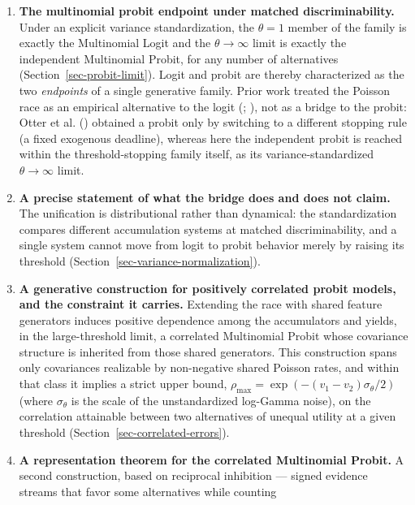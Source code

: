 \documentclass[
  man,
  floatsintext,
  longtable,
  a4paper,
  nolmodern,
  notxfonts,
  notimes,
  colorlinks=true,linkcolor=blue,citecolor=blue,urlcolor=blue]{apa7}
\begin{document}
\begin{enumerate}
\def\labelenumi{\arabic{enumi}.}
\item
  \textbf{The multinomial probit endpoint under matched
  discriminability.} Under an explicit variance standardization, the
  \(\theta = 1\) member of the family is exactly the Multinomial Logit
  and the \(\theta \to \infty\) limit is exactly the independent
  Multinomial Probit, for any number of alternatives
  (Section~\ref{sec-probit-limit}). Logit and probit are thereby
  characterized as the two \emph{endpoints} of a single generative
  family. Prior work treated the Poisson race as an empirical
  alternative to the logit
  (;
  ), not
  as a bridge to the probit: Otter et al.
  () obtained a
  probit only by switching to a different stopping rule (a fixed
  exogenous deadline), whereas here the independent probit is reached
  within the threshold-stopping family itself, as its
  variance-standardized \(\theta \to \infty\) limit.
\item
  \textbf{A precise statement of what the bridge does and does not
  claim.} The unification is distributional rather than dynamical: the
  standardization compares different accumulation systems at matched
  discriminability, and a single system cannot move from logit to probit
  behavior merely by raising its threshold
  (Section~\ref{sec-variance-normalization}).
\item
  \textbf{A generative construction for positively correlated probit
  models, and the constraint it carries.} Extending the race with shared
  feature generators induces positive dependence among the accumulators
  and yields, in the large-threshold limit, a correlated Multinomial
  Probit whose covariance structure is inherited from those shared
  generators. This construction spans only covariances realizable by
  non-negative shared Poisson rates, and within that class it implies a
  strict upper bound,
  \(\rho_{\max} = \exp(-(v_1 - v_2)\sigma_\theta/2)\) (where
  \(\sigma_\theta\) is the scale of the unstandardized log-Gamma noise),
  on the correlation attainable between two alternatives of unequal
  utility at a given threshold (Section~\ref{sec-correlated-errors}).
\item
  \textbf{A representation theorem for the correlated Multinomial
  Probit.} A second construction, based on reciprocal inhibition ---
  signed evidence streams that favor some alternatives while counting

\end{enumerate}
\end{document}

